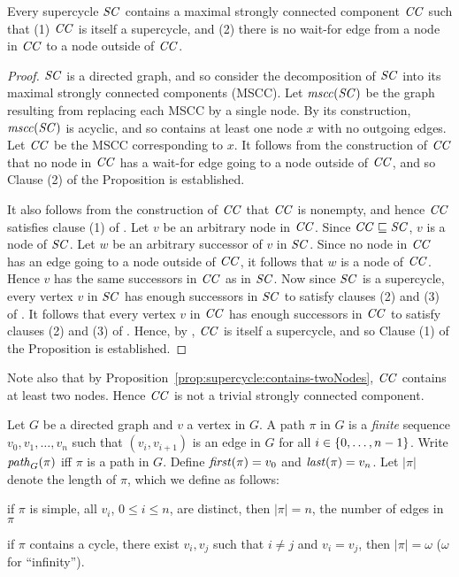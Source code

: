 \begin{proposition} \label{prop:supercycle:contains-mssc}
Every supercycle $\mathit{SC}$ contains a maximal strongly connected component $\mathit{CC}$
such that (1) $\mathit{CC}$ is itself a supercycle, and (2) there is no wait-for edge from a node in $\mathit{CC}$ to a node outside of $\mathit{CC}$.
\end{proposition}
%
\begin{proof}
$\mathit{SC}$ is a directed graph, and so consider the decomposition of $\mathit{SC}$
into its maximal strongly connected components (MSCC). Let $\mathit{mscc(\mathit{SC})}$ be the graph resulting
from replacing each MSCC by a single node. By its construction,  $\mathit{mscc(\mathit{SC})}$ is acyclic, and so contains at least one
node $x$ with no outgoing edges. Let $\mathit{CC}$ be the MSCC corresponding to $x$.
%
It follows from the construction of $\mathit{CC}$ that no node in $\mathit{CC}$ has a wait-for edge going to a node outside of
$\mathit{CC}$, and so Clause (2) of the Proposition is established.


It also follows from the construction of $\mathit{CC}$ that $\mathit{CC}$ is nonempty, and
hence $\mathit{CC}$ satisfies clause (1) of .
Let $v$ be an arbitrary node in $\mathit{CC}$. Since $\mathit{CC} \sqsubseteq \mathit{SC}$, $v$ is a node of $\mathit{SC}$. Let $w$ be an arbitrary successor of
$v$ in $\mathit{SC}$. Since no node in $\mathit{CC}$ has an edge going to a node outside of $\mathit{CC}$, it follows that $w$ is a node of $\mathit{CC}$.
Hence $v$ has the same successors in $\mathit{CC}$ as in $\mathit{SC}$. 
Now since $\mathit{SC}$ is a supercycle, every vertex $v$ in $\mathit{SC}$ has enough successors in $\mathit{SC}$ to satisfy clauses (2) and (3)
of . It follows that every vertex $v$ in $\mathit{CC}$ has enough successors in
$\mathit{CC}$ to satisfy clauses (2) and (3) of .  
%
Hence, by , $\mathit{CC}$ is itself a supercycle, and so Clause (1) of the Proposition is established.
\end{proof}

Note also that by Proposition~\ref{prop:supercycle:contains-twoNodes}, $\mathit{CC}$ contains at least two nodes. Hence $\mathit{CC}$ is
not a trivial strongly connected component.






\begin{definition} \label{def:path} \label{defn:path}
Let $G$ be a directed graph and $v$ a vertex in $G$. A path $\pi$ in $G$ is a \emph{finite} sequence
$v_0, v_1, \ldots,v_n$ such that $(v_i, v_{i+1})$ is an edge in $G$ for all $i \in \{ 0,\ldots,n-1 \}$.
Write $\mathit{path}_{G}(\pi)$ iff $\pi$ is a path in $G$.
Define $\mathit{first}(\pi) = v_0$ and $\mathit{last}(\pi) = v_n$. 
%
Let $|\pi|$ denote the length of $\pi$, which we define as follows:
\be
\item if $\pi$ is simple, \ie all $v_i$, $0 \le i \le n$, are distinct, then $|\pi| = n$, \ie the
number of edges in $\pi$
\item if $\pi$ contains a cycle, \ie there exist $v_i, v_j$ such that $i \ne j$ and $v_i = v_j$, then
$|\pi| = \omega$ ($\omega$ for ``infinity'').
\ee
\end{definition}

